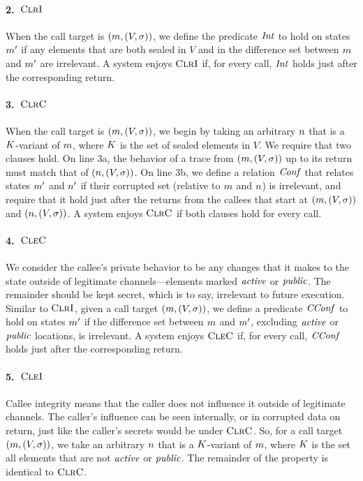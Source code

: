 \documentclass[10pt,conference]{ieeetran}%
\theoremstyle{definition}
\begin{document}
\paragraph*{2.~\(\textnormal{\sc ClrI}\)}
When the call target is \((m,(V,\sigma))\), we define the predicate \(\mathit{Int}\) to hold
on states \(m'\) if any elements that are both sealed in \(V\) and in the difference
set between \(m\) and \(m'\) are irrelevant. A system enjoys \(\textnormal{\sc ClrI}\) if, for every
call, \(\mathit{Int}\) holds just after the corresponding return.

\paragraph*{3.~\(\textnormal{\sc ClrC}\)}
When the call target is \((m,(V,\sigma))\), we begin by taking an arbitrary \(n\)
that is a \(K\)-variant of \(m\), where \(K\) is the set of sealed elements
in \(V\). We require that two clauses hold. On line 3a, the behavior of a trace from
\((m,(V,\sigma))\) up to its return must match that of \((n,(V,\sigma))\).
On line 3b, we define a relation \(\mathit{Conf}\) that relates states \(m'\) and \(n'\)
if their corrupted set (relative to \(m\) and \(n\)) is irrelevant, and require
that it hold just after the returns from the callees that start at \((m,(V,\sigma))\) and \((n,(V,\sigma))\).
A system enjoys \(\textnormal{\sc ClrC}\) if both clauses hold for every call.

\paragraph*{4.~\(\textnormal{\sc CleC}\)}
We consider the callee's private behavior to be any changes that it makes to the state
outside of legitimate channels---elements marked \(\mathit{active}\) or \(\mathit{public}\). The remainder
should be kept secret, which is to say, irrelevant to future execution. Similar to \(\textnormal{\sc ClrI}\), given a call target
\((m,(V,\sigma))\), we define a predicate \(\mathit{CConf}\) to hold
on states \(m'\) if the difference set between \(m\) and \(m'\), excluding
\(\mathit{active}\) or \(\mathit{public}\) locations, is irrelevant.
A system enjoys \(\textnormal{\sc CleC}\) if, for every call, \(\mathit{CConf}\) holds just after the corresponding return.

\paragraph*{5.~\(\textnormal{\sc CleI}\)}
Callee integrity means that the caller does not influence it outside of legitimate
channels. The caller's influence can be seen internally, or in corrupted data on return,
just like the caller's secrets would be under \(\textnormal{\sc ClrC}\). So, for a call target
\((m,(V,\sigma))\), we take an arbitrary \(n\) that is a \(K\)-variant
of \(m\), where \(K\) is the set all elements that are not \(\mathit{active}\)
or \(\mathit{public}\). The remainder of the property is identical to \(\textnormal{\sc ClrC}\).
\end{document}
